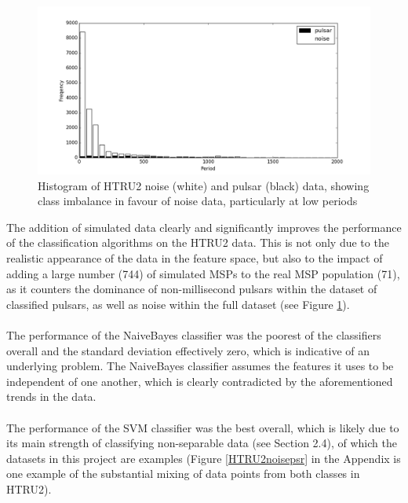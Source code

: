 \documentclass[12pt]{article}
\begin{document}
\paragraph{}
\begin{figure}[h!]
\begin{center}
\includegraphics[scale=0.4]{pulsar_period_hist.png}
\caption{Histogram of HTRU2 noise (white) and pulsar (black) data, showing class imbalance in favour of noise data, particularly at low periods}
\label{HTRU2hist}
\end{center}
\end{figure}

The addition of simulated data clearly and significantly improves the performance of the classification algorithms on the HTRU2 data. This is not only due to the realistic appearance of the data in the feature space, but also to the impact of adding a large number (744) of simulated MSPs to the real MSP population (71), as it counters the dominance of non-millisecond pulsars within the dataset of classified pulsars, as well as noise within the full dataset (see Figure \ref{HTRU2hist}).
\paragraph{}
The performance of the NaiveBayes classifier was the poorest of the classifiers overall and the standard deviation effectively zero, which is indicative of an underlying problem. The NaiveBayes classifier assumes the features it uses to be independent of one another, which is clearly contradicted by the aforementioned trends in the data.
\paragraph{}
The performance of the SVM classifier was the best overall, which is likely due to its main strength of classifying non-separable data (see Section 2.4), of which the datasets in this project are examples (Figure \ref{HTRU2noisepsr} in the Appendix is one example of the substantial mixing of data points from both classes in HTRU2).
\end{document}
